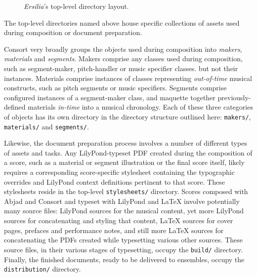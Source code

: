 \begin{figure}[h!]
\begin{singlespacing}
\vspace{-0.5\baselineskip}
\noindent%
\end{singlespacing}
\caption{\emph{Ersilia}'s top-level directory layout.}
\end{figure}

\noindent The top-level directories named above house specific collections of
assets used during composition or document preparation.

Consort very broadly groups the objects used during composition into
\emph{makers}, \emph{materials} and \emph{segments}. Makers comprise any
classes used during composition, such as segment-maker, pitch-handler or music
specifier classes. but not their instances. Materials comprise instances of
classes representing \emph{out-of-time} musical constructs, such as pitch
segments or music specifiers. Segments comprise configured instances of a
segment-maker class, and maquette together previously-defined materials
\emph{in-time} into a musical chronology. Each of these three categories of
objects has its own directory in the directory structure outlined here:
\texttt{makers/}, \texttt{materials/} and \texttt{segments/}.

Likewise, the document preparation process involves a number of different types
of assets and tasks. Any LilyPond-typeset PDF created during the composition of
a score, such as a material or segment illustration or the final score itself,
likely requires a corresponding score-specific stylesheet containing the
typographic overrides and LilyPond context definitions pertinent to that score.
These stylesheets reside in the top-level \texttt{stylesheets/} directory.
Scores composed with Abjad and Consort and typeset with LilyPond and LaTeX
involve potentially many source files: LilyPond sources for the musical
content, yet more LilyPond sources for concatenating and styling that content,
LaTeX sources for cover pages, prefaces and performance notes, and still more
LaTeX sources for concatenating the PDFs created while typesetting various
other sources. These source files, in their various stages of typesetting,
occupy the \texttt{build/} directory. Finally, the finished documents, ready to
be delivered to ensembles, occupy the \texttt{distribution/} directory.

